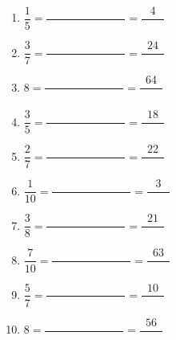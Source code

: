 \documentclass[9pt]{article}
\begin{document}
\begin{multicols}{2}
\begin{exercice}
\begin{enumerate}
	\item $\dfrac{1}{5} = \dfrac{\phantom{00000000000000}}{\phantom{00000000000000}} = $$\dfrac{4}{\phantom{0000}}$
	\item $\dfrac{3}{7} = \dfrac{\phantom{00000000000000}}{\phantom{00000000000000}} = $$\dfrac{24}{\phantom{0000}}$
	\item $8 = \dfrac{\phantom{00000000000000}}{\phantom{00000000000000}} = $$\dfrac{64}{\phantom{0000}}$
	\item $\dfrac{3}{5} = \dfrac{\phantom{00000000000000}}{\phantom{00000000000000}} = $$\dfrac{18}{\phantom{0000}}$
	\item $\dfrac{2}{7} = \dfrac{\phantom{00000000000000}}{\phantom{00000000000000}} = $$\dfrac{22}{\phantom{0000}}$
	\item $\dfrac{1}{10} = \dfrac{\phantom{00000000000000}}{\phantom{00000000000000}} = $$\dfrac{3}{\phantom{0000}}$
	\item $\dfrac{3}{8} = \dfrac{\phantom{00000000000000}}{\phantom{00000000000000}} = $$\dfrac{21}{\phantom{0000}}$
	\item $\dfrac{7}{10} = \dfrac{\phantom{00000000000000}}{\phantom{00000000000000}} = $$\dfrac{63}{\phantom{0000}}$
	\item $\dfrac{5}{7} = \dfrac{\phantom{00000000000000}}{\phantom{00000000000000}} = $$\dfrac{10}{\phantom{0000}}$
	\item $8 = \dfrac{\phantom{00000000000000}}{\phantom{00000000000000}} = $$\dfrac{56}{\phantom{0000}}$
\end{enumerate}
\end{exercice}


\end{multicols}
\end{document}
